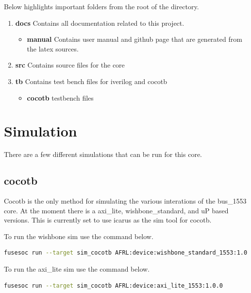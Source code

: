 \par
Below highlights important folders from the root of the directory.

\begin{enumerate}
  \item \textbf{docs} Contains all documentation related to this project.
    \begin{itemize}
      \item \textbf{manual} Contains user manual and github page that are generated from the latex sources.
    \end{itemize}
  \item \textbf{src} Contains source files for the core
  \item \textbf{tb} Contains test bench files for iverilog and cocotb
    \begin{itemize}
      \item \textbf{cocotb} testbench files
    \end{itemize}
\end{enumerate}

\newpage

\section{Simulation}
\par
There are a few different simulations that can be run for this core.

\subsection{cocotb}
\par
Cocotb is the only method for simulating the various interations of the bus\_1553 core. At the moment there is a
axi\_lite, wishbone\_standard, and uP based versions. This is currently set to use icarus as the sim tool for cocotb.

\par
To run the wishbone sim use the command below.
\begin{lstlisting}[language=bash]
fusesoc run --target sim_cocotb AFRL:device:wishbone_standard_1553:1.0.0
\end{lstlisting}

\par
To run the axi\_lite sim use the command below.
\begin{lstlisting}[language=bash]
fusesoc run --target sim_cocotb AFRL:device:axi_lite_1553:1.0.0
\end{lstlisting}

